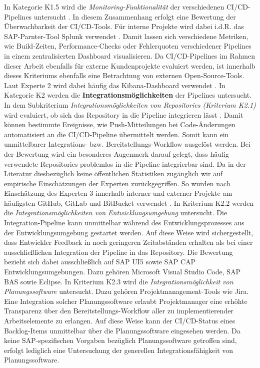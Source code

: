In Kategorie K1.5 wird die \textit{Monitoring-Funktionalität} der verschiedenen CI/CD-Pipelines untersucht \cite[Z. 37 ff.]{ProductManagerSAPHyperspaceCICD.}. In diesem Zusammenhang erfolgt eine Bewertung der Überwachbarkeit der CI/CD-Tools. Für interne Projekte wird dabei i.d.R. das SAP-Parnter-Tool Splunk verwendet \cite[Z. 70]{ProductManagerSAPHyperspaceCICD.}. Damit lassen sich verschiedene Metriken, wie Build-Zeiten, Performance-Checks oder Fehlerquoten verschiedener Pipelines in einem zentralisierten Dashboard visualisieren. Da CI/CD-Pipelines im Rahmen dieser Arbeit ebenfalls für externe Kundenprojekte evaluiert werden, ist innerhalb dieses Kriteriums ebenfalls eine Betrachtung von externen Open-Source-Tools. Laut Experte 2 wird dabei häufig das Kibana-Dashboard verwendet \cite[Z. 70]{ProductManagerSAPHyperspaceCICD.}. In Kategorie K2 werden die \textbf{Integrationsmöglichkeiten} der Pipelines untersucht. In dem Subkriterium \textit{Integrationsmöglichkeiten von Repositories (Kriterium K2.1)}  wird evaluiert, ob sich das Repository in die Pipeline integrieren lässt \cite[Z. 79]{ProductOwnerSAPBTPProd&Infra.}. Damit können bestimmte Ereignisse, wie Push-Mitteilungen bei Code-Änderungen automatisiert an die CI/CD-Pipeline übermittelt werden. Somit kann ein unmittelbarer Integrations- bzw. Bereitstellungs-Workflow ausgelöst werden. Bei der Bewertung wird ein besonderes Augenmerk darauf gelegt, dass häufig verwendete Repositories problemlos in die Pipeline integrierbar sind. Da in der Literatur diesbezüglich keine öffentlichen Statistiken zugänglich wir auf empirische Einschätzungen der Experten zurückgegriffen. So wurden nach Einschätzung des Experten 3 innerhalb interner und externer Projekte am häufigsten GitHub, GitLab und BitBucket verwendet \cite[Z. 85]{TestDeveloperSAPHyperspaceAdoption&Onboarding.}. In Kriterium K2.2 werden die \textit{Integrationsmöglichkeiten von Entwicklungsumgebung} untersucht. Die Integration-Pipeline kann unmittelbar während des Entwicklungsprozesses aus der Entwicklungsumgebung gestartet werden. Auf diese Weise wird sichergestellt, dass Entwickler Feedback in noch geringeren Zeitabständen erhalten als bei einer ausschließlichen Integration der Pipeline in das Repository. Die Bewertung bezieht sich dabei ausschließlich auf SAP UI5 sowie SAP CAP Entwicklungsumgebungen. Dazu gehören Microsoft Visual Studio Code, \ac{SAP BAS} sowie Eclipse.
In Kriterium K2.3 wird die \textit{Integrationsmöglichkeit von Planungssoftware} untersucht. Dazu gehören Projektmanagement-Tools wie Jira. Eine Integration solcher Planungssoftware erlaubt Projektmanager eine erhöhte Transparenz über den Bereitstellungs-Workflow aller zu implementierender Arbeitselemente zu erlangen. Auf diese Weise kann der CI/CD-Status eines Backlog-Items unmittelbar über die Planungssoftware eingesehen werden. Da keine SAP-spezifischen Vorgaben bezüglich Planungssoftware getroffen sind, erfolgt lediglich eine Untersuchung der generellen Integrationsfähigkeit von Planungssoftware.\\ 
